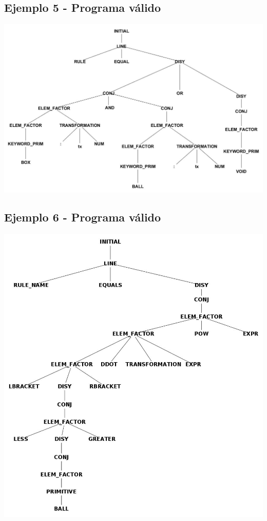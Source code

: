 \subsection{Ejemplo 5 - Programa v\'alido}

\centerline{\includegraphics[scale=0.40]{arboles_derivacion/Ejemplo_and_or1.jpg}}

\subsection{Ejemplo 6 - Programa v\'alido}

\centerline{\includegraphics[scale=0.40]{arboles_derivacion/brackets_less_greater1.jpg}}
